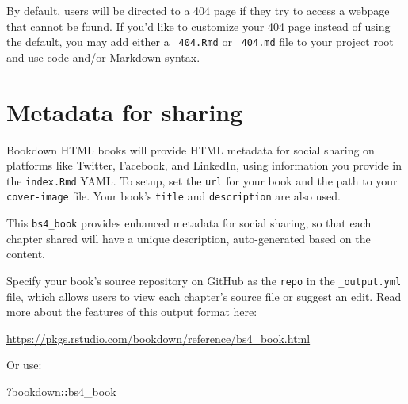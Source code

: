 \documentclass[
]{report}
\newenvironment{Shaded}{\begin{snugshade}}{\end{snugshade}}
\newcommand{\NormalTok}[1]{#1}
\newcommand{\SpecialCharTok}[1]{\textcolor[rgb]{0.81,0.36,0.00}{\textbf{#1}}}
\theoremstyle{definition}
\theoremstyle{definition}
\theoremstyle{definition}
\theoremstyle{definition}
\theoremstyle{remark}
\begin{document}
By default, users will be directed to a 404 page if they try to access a webpage that cannot be found. If you'd like to customize your 404 page instead of using the default, you may add either a \texttt{\_404.Rmd} or \texttt{\_404.md} file to your project root and use code and/or Markdown syntax.

\hypertarget{metadata-for-sharing}{%
\section{Metadata for sharing}\label{metadata-for-sharing}}

Bookdown HTML books will provide HTML metadata for social sharing on platforms like Twitter, Facebook, and LinkedIn, using information you provide in the \texttt{index.Rmd} YAML. To setup, set the \texttt{url} for your book and the path to your \texttt{cover-image} file. Your book's \texttt{title} and \texttt{description} are also used.

This \texttt{bs4\_book} provides enhanced metadata for social sharing, so that each chapter shared will have a unique description, auto-generated based on the content.

Specify your book's source repository on GitHub as the \texttt{repo} in the \texttt{\_output.yml} file, which allows users to view each chapter's source file or suggest an edit. Read more about the features of this output format here:

\url{https://pkgs.rstudio.com/bookdown/reference/bs4_book.html}

Or use:

\begin{Shaded}
\begin{Highlighting}[]
\NormalTok{?bookdown}\SpecialCharTok{::}\NormalTok{bs4\_book}
\end{Highlighting}
\end{Shaded}


  
\end{document}
